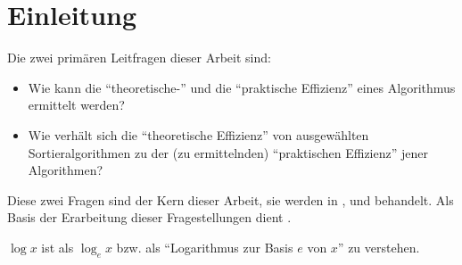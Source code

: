 \chapter*{Einleitung}


Die zwei primären Leitfragen dieser Arbeit sind:

\begin{itemize}
    \item Wie kann die \enquote{theoretische-} und die \enquote{praktische Effizienz} eines Algorithmus ermittelt werden?
    \item Wie verhält sich die \enquote{theoretische Effizienz} von ausgewählten Sortieralgorithmen zu der (zu ermittelnden) \enquote{praktischen Effizienz} jener Algorithmen?
\end{itemize}

Diese zwei Fragen sind der Kern dieser Arbeit, sie werden in ,  und  behandelt. Als Basis der Erarbeitung dieser Fragestellungen dient .

$\log x$ ist als $\log_{e} x$ bzw. als \enquote{Logarithmus zur Basis $e$ von $x$} zu verstehen. 
